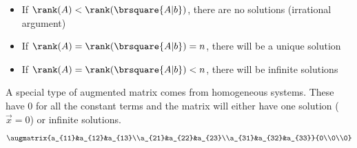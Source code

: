 \begin{itemize}
    \item If $\rank(A)<\rank(\brsquare{A|b})$, there are no solutions (irrational argument)
    \item If $\rank(A)=\rank(\brsquare{A|b})=n$, there will be a unique solution
    \item If $\rank(A)=\rank(\brsquare{A|b})<n$, there will be infinite solutions
\end{itemize}
A special type of augmented matrix comes from homogeneous systems. These have 0 for all the constant terms and the matrix will either have one solution ($\vec{x}=0$) or infinite solutions.
$$\augmatrix{a_{11}&a_{12}&a_{13}\\a_{21}&a_{22}&a_{23}\\a_{31}&a_{32}&a_{33}}{0\\0\\0}$$



